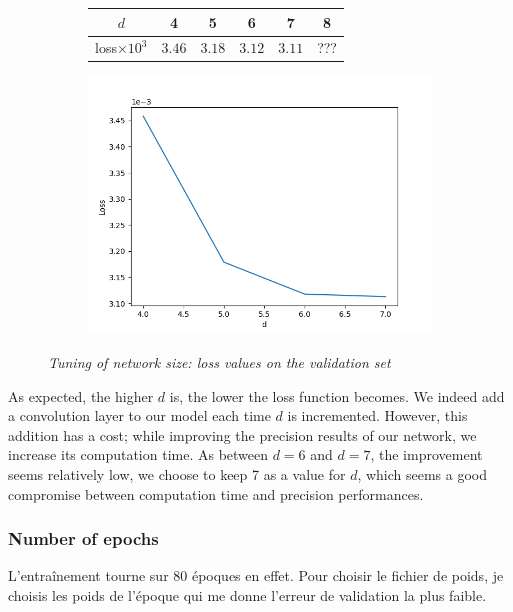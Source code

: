 \documentclass{article}
\begin{document}
            \begin{figure}[!ht]
                \begin{subfigure}{.49\linewidth}
                    \center
                    \begin{tabular}{|c|c|c|c|c|c|}
                        \hline
                        $d$ & 4 & 5 & 6 & 7 & 8 \\
                        \hline \hline
                        loss$\times 10^3$ & $3.46$ & $3.18$ & $3.12$ & $3.11$ & ??? \\
                        \hline
                    \end{tabular}
                \end{subfigure}
                \begin{subfigure}{.49\linewidth}
                    \centering
                    \includegraphics[width=.8\linewidth]{pics/hpp-d.png}
                \end{subfigure}
                \caption{\textit{Tuning of network size: loss values on the validation set}}
            \end{figure}
            \par
            As expected, the higher $d$ is, the lower the loss function becomes. We indeed add a convolution layer to our model each time $d$ is incremented. However, this addition has a cost; while improving the precision results of our network, we increase its computation time. As between $d=6$ and $d=7$, the improvement seems relatively low, we choose to keep 7 as a value for $d$, which seems a good compromise between computation time and precision performances.

        \subsubsection{Number of epochs}
            L'entraînement tourne sur 80 époques en effet. Pour choisir le fichier de poids, je choisis les poids de l'époque qui me donne l'erreur de validation la plus faible.
\end{document}
